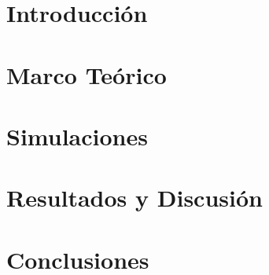 \documentclass[a4paper,12pt]{report}
\begin{document}
 



\tableofcontents
\chapter{Introducción}

\chapter{Marco Teórico}

\chapter{Simulaciones}

\chapter{Resultados y Discusión}

\chapter{Conclusiones}

\end{document}
